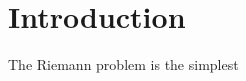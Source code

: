 \documentclass[review]{elsarticle}
\begin{document}
\section{Introduction}
The Riemann problem is the simplest  
%
%
%
%
\end{document}
